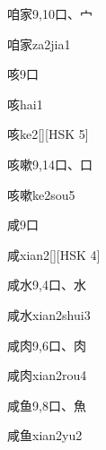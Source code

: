\begin{Entry}{咱家}{9,10}{⼝、⼧}
  \begin{Phonetics}{咱家}{za2jia1}
  \end{Phonetics}
\end{Entry}

\begin{Entry}{咳}{9}{⼝}
  \begin{Phonetics}{咳}{hai1}
  \end{Phonetics}
  \begin{Phonetics}{咳}{ke2}[][HSK 5]
  \end{Phonetics}
\end{Entry}

\begin{Entry}{咳嗽}{9,14}{⼝、⼝}
  \begin{Phonetics}{咳嗽}{ke2sou5}
  \end{Phonetics}
\end{Entry}

\begin{Entry}{咸}{9}{⼝}
  \begin{Phonetics}{咸}{xian2}[][HSK 4]
  \end{Phonetics}
\end{Entry}

\begin{Entry}{咸水}{9,4}{⼝、⽔}
  \begin{Phonetics}{咸水}{xian2shui3}
  \end{Phonetics}
\end{Entry}

\begin{Entry}{咸肉}{9,6}{⼝、⾁}
  \begin{Phonetics}{咸肉}{xian2rou4}
  \end{Phonetics}
\end{Entry}

\begin{Entry}{咸鱼}{9,8}{⼝、⿂}
  \begin{Phonetics}{咸鱼}{xian2yu2}
  \end{Phonetics}
\end{Entry}

